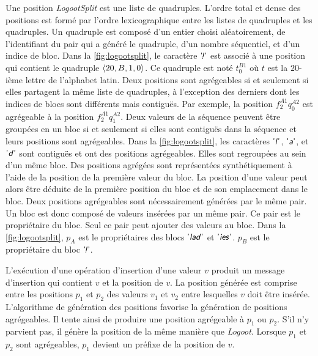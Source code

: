 Une position \emph{LogootSplit} est une liste de quadruples.
L'ordre total et dense des positions est formé par l'ordre lexicographique entre les listes de quadruples et les quadruples.
Un quadruple est composé d'un entier choisi aléatoirement, de l'identifiant du pair qui a généré le quadruple, d'un nombre séquentiel, et d'un indice de bloc.
Dans la \autoref{fig:logootsplit}, le caractère $\textsf{'\textit{\negthinspace!}'}$ est associé à une position qui contient le quadruple $\langle20, B, 1, 0\rangle$.
Ce quadruple est noté $t^{B1}_0$ où $t$ est la $20$-ième lettre de l'alphabet latin.
Deux positions sont agrégeables si et seulement si elles partagent la même liste de quadruples, à l'exception des derniers dont les indices de blocs sont différents mais contiguës.
Par exemple, la position $f^{A1}_2q^{A2}_0$ est agrégeable à la position $f^{A1}_2q^{A2}_1$.
Deux valeurs de la séquence peuvent être groupées en un bloc si et seulement si elles sont contiguës dans la séquence et leurs positions sont agrégeables.
Dans la \autoref{fig:logootsplit}, les caractères $\textsf{'\textit{l}'}$, $\textsf{'\textit{a}'}$, et $\textsf{'\textit{d}'}$ sont contiguës et ont des positions agrégeables.
Elles sont regroupées au sein d'un même bloc.
Des positions agrégées sont représentées synthétiquement à l'aide de la position de la première valeur du bloc.
La position d'une valeur peut alors être déduite de la première position du bloc et de son emplacement dans le bloc.
Deux positions agrégeables sont nécessairement générées par le même pair.
Un bloc est donc composé de valeurs insérées par un même pair.
Ce pair est le propriétaire du bloc.
Seul ce pair peut ajouter des valeurs au bloc.
Dans la \autoref{fig:logootsplit}, $p_A$ est le propriétaires des blocs $\textsf{'\textit{lad}'}$ et $\textsf{'\textit{ies}'}$.
$p_B$ est le propriétaire du bloc $\textsf{'\textit{\negthinspace!}'}$.

L'exécution d'une opération d'insertion d'une valeur $v$ produit un message d'insertion qui contient $v$ et la position de $v$.
La position générée est comprise entre les positions $p_1$ et $p_2$ des valeurs $v_1$ et $v_2$ entre lesquelles $v$ doit être insérée.
L'algorithme de génération des positions favorise la génération de positions agrégeables.
Il tente ainsi de produire une position agrégeable à $p_1$ ou $p_2$.
S'il n'y parvient pas, il génère la position de la même manière que \emph{Logoot}.
Lorsque $p_1$ et $p_2$ sont agrégeables, $p_1$ devient un préfixe de la position de $v$.

